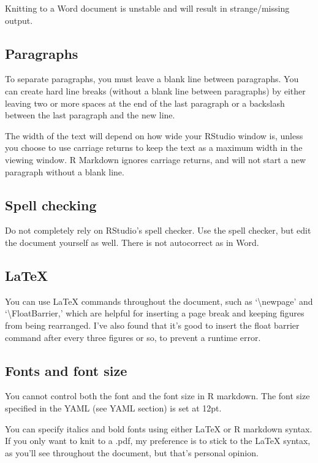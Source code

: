 \documentclass[12pt,]{article}
\begin{document}
Knitting to a Word document is unstable and will result in
strange/missing output.

\subsection{Paragraphs}\label{paragraphs}

To separate paragraphs, you must leave a blank line between paragraphs.
You can create hard line breaks (without a blank line between
paragraphs) by either leaving two or more spaces at the end of the last
paragraph or a backslash between the last paragraph and the new line.

The width of the text will depend on how wide your RStudio window is,
unless you choose to use carriage returns to keep the text as a maximum
width in the viewing window. R Markdown ignores carriage returns, and
will not start a new paragraph without a blank line.

\subsection{Spell checking}\label{spell-checking}

Do not completely rely on RStudio's spell checker. Use the spell
checker, but edit the document yourself as well. There is not
autocorrect as in Word.

\subsection{LaTeX}\label{latex}

You can use LaTeX commands throughout the document, such as
`\textbackslash{}newpage' and `\textbackslash{}FloatBarrier,' which are
helpful for inserting a page break and keeping figures from being
rearranged. I've also found that it's good to insert the float barrier
command after every three figures or so, to prevent a runtime error.

\subsection{Fonts and font size}\label{fonts-and-font-size}

You cannot control both the font and the font size in R markdown. The
font size specified in the YAML (see YAML section) is set at 12pt.

You can specify italics and bold fonts using either LaTeX or R markdown
syntax. If you only want to knit to a .pdf, my preference is to stick to
the LaTeX syntax, as you'll see throughout the document, but that's
personal opinion.
\end{document}
